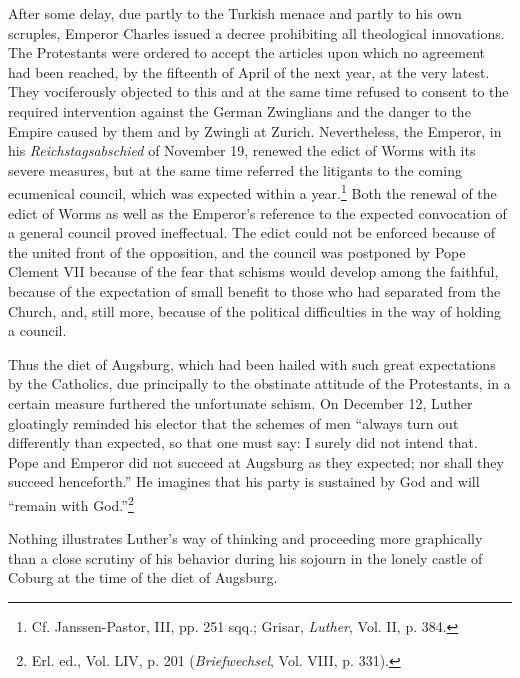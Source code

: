 After some delay, due partly to the Turkish menace and partly to
his own scruples, Emperor Charles issued a decree prohibiting all theological
innovations. The Protestants were ordered to accept the articles
upon which no agreement had been reached, by the fifteenth of April
of the next year, at the very latest. They vociferously objected to this
and at the same time refused to consent to the required intervention
against the German Zwinglians and the danger to the Empire caused
by them and by Zwingli at Zurich. Nevertheless, the Emperor, in his
\textit{Reichstagsabschied} of November 19, renewed the edict of Worms
with its severe measures, but at the same time referred the litigants to
the coming ecumenical council, which was expected within a year.\footnote
{Cf. Janssen-Pastor, III, pp. 251 sqq.; Grisar, \textit{Luther}, Vol. II, p. 384.}
Both the renewal of the edict of Worms as well as the Emperor’s
reference to the expected convocation of a general council proved
ineffectual. The edict could not be enforced because of the united
front of the opposition, and the council was postponed by Pope
Clement VII because of the fear that schisms would develop among
the faithful, because of the expectation of small benefit to those who
had separated from the Church, and, still more, because of the political
difficulties in the way of holding a council.

Thus the diet of Augsburg, which had been hailed with such great
expectations by the Catholics, due principally to the obstinate attitude
of the Protestants, in a certain measure furthered the unfortunate
schism. On December 12, Luther gloatingly reminded his elector that
the schemes of men “always turn out differently than expected, so that
one must say: I surely did not intend that. Pope and Emperor did not
succeed at Augsburg as they expected; nor shall they succeed henceforth.”
He imagines that his party is sustained by God and will
“remain with God.”\footnote{Erl. ed., Vol. LIV, p. 201 (\textit{Briefwechsel}, Vol. VIII, p. 331).}

Nothing illustrates Luther’s way of thinking and proceeding
more graphically than a close scrutiny of his behavior during his
sojourn in the lonely castle of Coburg at the time of the diet of Augsburg.
